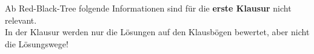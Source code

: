 Ab Red-Black-Tree folgende Informationen sind für die \textbf{erste Klausur} nicht relevant.\\
In der Klausur werden nur die Lösungen auf den Klausbögen bewertet, aber nicht die Lösungswege!